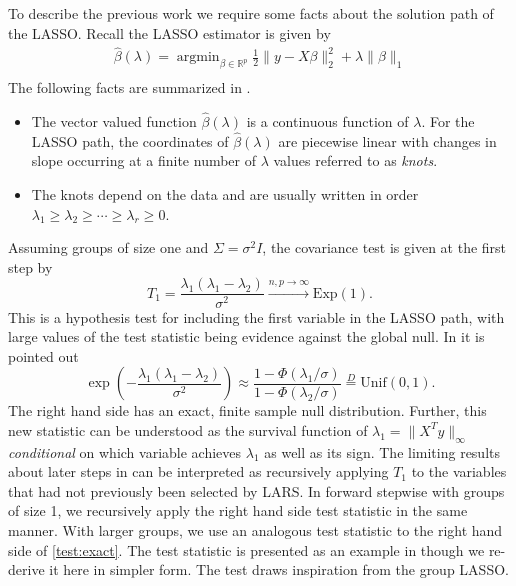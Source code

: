 \documentclass{imsart}
\newcommand{\argmin}{\mathop{\mathrm{argmin}}}
\newcommand{\real}{\mathbb{R}}
\begin{document}
To describe the previous work we require some facts about the solution path
of the LASSO.
Recall the LASSO estimator is given by
\begin{equation}
\begin{aligned}
\label{eq:lasso}
\displaystyle \hat \beta(\lambda) = \argmin_{\beta \in \real^p} \frac{1}{2} \| y - X \beta \|_2^2 +
   \lambda \| \beta \|_1 \\
\end{aligned}
\end{equation}
The following facts are summarized in \cite{significance:lasso,tibshirani_LASSO_uniqueness}.

\begin{itemize}

  \item The vector valued function $\hat \beta(\lambda)$ is a
    continuous function of $\lambda$. For the LASSO path, the
    coordinates of $\hat \beta(\lambda)$ are piecewise linear with
    changes in slope occurring at a finite number of $\lambda$ values
    referred to as \emph{knots}. 
    \item The knots depend on the data and are
    usually written in order $\lambda_1 \geq \lambda_2 \geq \cdots
    \geq \lambda_r \geq 0$. 

\end{itemize}

Assuming groups of size one and $\Sigma = \sigma^2 I$, the covariance test is given at the first step by
\begin{equation}
\label{eq:covtest}
T_1 = \frac{\lambda_1(\lambda_1-\lambda_2)}{\sigma^2} \overset{n,p \to \infty}{\to} \text{Exp}(1).
\end{equation}
This is a hypothesis test for including the first variable in the LASSO
path, with large values of the test statistic being evidence against the
global null.
In \cite{tests:adaptive} it is pointed out 
\begin{equation}
\label{test:exact}
\exp\left(- \frac{\lambda_1(\lambda_1-\lambda_2)}{\sigma^2} \right) \approx \frac{1 - \Phi(\lambda_1/\sigma)}{1 - \Phi(\lambda_2 / \sigma)} \overset{D}{=} \text{Unif}(0,1).
\end{equation}
The right hand side has an exact, finite sample null distribution.
Further, this new statistic can be understood as the survival function of $\lambda_1 = \|X^Ty\|_{\infty}$
{\em conditional} on which variable achieves $\lambda_1$ as well as its sign.
The limiting results about later steps in \cite{significance:lasso} can
be interpreted as
recursively applying $T_1$ to the variables that had not previously been selected by LARS. In forward stepwise with groups of size 1, we recursively apply the right hand side test statistic in the same manner. With larger groups, we use an analogous test statistic to the right hand side of \eqref{test:exact}. The test statistic is presented as an example in \cite{tests:adaptive} though we re-derive it here in simpler form. The test draws inspiration
from the group LASSO.
\end{document}

